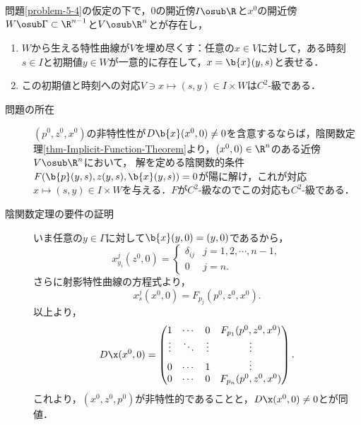 \documentclass[uplatex,dvipdfmx]{jsreport}
\begin{document}
\begin{lemma}[局所可逆性]
    問題\ref{problem-5-4}の仮定の下で，$0$の開近傍$I\osub\R$と$x^0$の開近傍$W\osub\Gamma\subset\R^{n-1}$と$V\osub\R^{n}$とが存在し，
    \begin{enumerate}
        \item $W$から生える特性曲線が$V$を埋め尽くす：任意の$x\in V$に対して，ある時刻$s\in I$と初期値$y\in W$が一意的に存在して，$x=\b{x}(y,s)$と表せる．
        \item この初期値と時刻への対応$V\ni x\mapsto (s,y)\in I\times W$は$C^2$-級である．
    \end{enumerate}
\end{lemma}
\begin{Proof}\mbox{}
    \begin{description}
        \item[問題の所在] $(p^0,z^0,x^0)$の非特性性が$D\b{x}(x^0,0)\ne0$を含意するならば，陰関数定理\ref{thm-Implicit-Function-Theorem}より，$(x^0,0)\in\R^n$のある近傍$V\osub\R^{n}$において，
        解を定める陰関数的条件$F(\b{p}(y,s),z(y,s),\b{x}(y,s))=0$が陽に解け，これが対応$x\mapsto (s,y)\in I\times W$を与える．$F$が$C^2$-級なのでこの対応も$C^2$-級である．
        \item[陰関数定理の要件の証明] いま任意の$y\in\Gamma$に対して$\b{x}(y,0)=(y,0)$であるから，
        \[x^j_{y_i}(z^0,0)=\begin{cases}
            \delta_{ij}&j=1,2,\cdots,n-1,\\
            0&j=n.
        \end{cases}\]
        さらに射影特性曲線の方程式より，
        \[x_{s}^j(x^0,0)=F_{p_j}(p^0,z^0,x^0).\]
        以上より，
        \[D\x(x^0,0)=\begin{pmatrix}
            1&\cdots&0&F_{p_1}(p^0,z^0,x^0)\\
            \vdots&\ddots&\vdots&\vdots\\
            0&\cdots&1&\vdots\\
            0&\cdots&0&F_{p_n}(p^0,z^0,x^0)
        \end{pmatrix}.\]
        これより，$(x^0,z^0,p^0)$が非特性的であることと，$D\x(x^0,0)\ne0$とが同値．
    \end{description}
\end{Proof}
\end{document}
